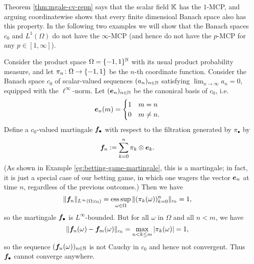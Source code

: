 Theorem \ref{thm:mgale-cv-repn} says that the scalar field $\mathbb{K}$ has the $1$-MCP, and arguing coordinatewise shows that every finite dimensioal Banach space also has this property.
In the following two examples we will show that the Banach spaces $c_0$ and $L^1(\Omega)$ do not have the $\infty$-MCP (and hence do not have the $p$-MCP for any $p \in [1,\infty]$). 

\begin{example}\label{eg:c0-noMCP}
  Consider the product space $\Omega = \{-1,1\}^{\mathbb{N}}$ with its usual product probability measure, and let $\pi_n \colon \Omega \rightarrow \{-1,1\}$ be the $n$-th coordinate function.
  Consider the Banach space $c_0$ of scalar-valued sequences $(a_n)_{n \in \mathbb{N}}$ satisfying $\lim_{n \to \infty} a_n = 0$, equipped with the $\ell^\infty$-norm.
  Let $(\bm{e}_n)_{n \in \mathbb{N}}$ be the canonical basis of $c_0$, i.e.
  \begin{equation*}
    \bm{e}_n(m) = \begin{cases} 1 & m=n \\ 0 & m \neq n. \end{cases}
  \end{equation*}
  Define a $c_0$-valued martingale $\bm{f}_\bullet$ with respect to the filtration generated by $\pi_{\bullet}$ by
  \begin{equation*}
    \bm{f}_n := \sum_{k = 0}^{n} \pi_k \otimes \bm{e}_k.
  \end{equation*} 
  (As shown in Example \ref{eg:betting-game-martingale}, this is a martingale; in fact, it is just a special case of our betting game, in which one wagers the vector $\bm{e}_n$ at time $n$, regardless of the previous outcomes.)
  Then we have
  \begin{equation*}
    \|\bm{f}_n\|_{L^\infty(\Omega;c_0)} = \operatorname*{ess\,sup}_{\omega \in \Omega} \|(\pi_k(\omega))_{k = 0}^n\|_{c_0} = 1,
  \end{equation*}
  so the martingale $\bm{f}_{\bullet}$ is $L^\infty$-bounded.
  But for all $\omega$ in $\Omega$ and all $n < m$, we have
  \begin{equation*}
    \|\bm{f}_n(\omega) - \bm{f}_m(\omega)\|_{c_0} = \max_{n < k \leq m} |\pi_k(\omega)| = 1,
  \end{equation*}
  so the sequence $(\bm{f}_n(\omega))_{n \in \mathbb{N}}$ is not Cauchy in $c_0$ and hence not convergent.
  Thus $\bm{f}_{\bullet}$ cannot converge anywhere.
\end{example}

